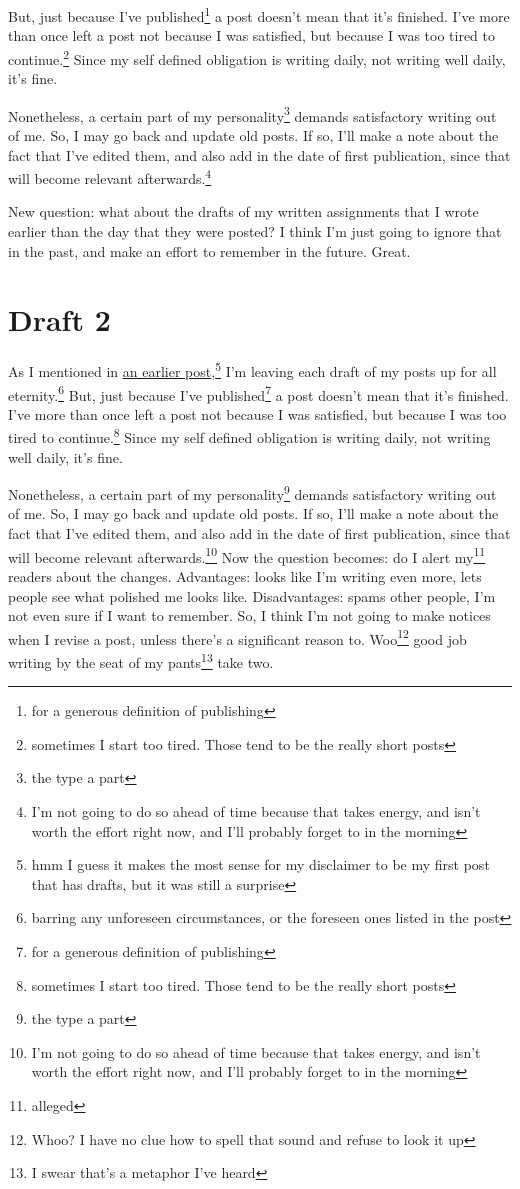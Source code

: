 \documentclass[12pt]{article}[titlepage]
\newcommand{\1}{\={a}}
\newcommand{\2}{\={e}}
\newcommand{\3}{\={\i}}
\newcommand{\4}{\=o}
\newcommand{\5}{\=u}
\newcommand{\6}{\={A}}
\renewcommand{\,}{\textsuperscript{,}}
\begin{document}
But, just because I've published\footnote{for a generous definition of publishing} a post doesn't mean that it's finished.
I've more than once left a post not because I was satisfied, but because I was too tired to continue.\footnote{sometimes I start too tired. Those tend to be the really short posts}
Since my self defined obligation is writing daily, not writing well daily, it's fine.

Nonetheless, a certain part of my personality\footnote{the type a part} demands satisfactory writing out of me.
So, I may go back and update old posts.
If so, I'll make a note about the fact that I've edited them, and also add in the date of first publication, since that will become relevant afterwards.\footnote{I'm not going to do so ahead of time because that takes energy, and isn't worth the effort right now, and I'll probably forget to in the morning}

New question: what about the drafts of my written assignments that I wrote earlier than the day that they were posted?
I think I'm just going to ignore that in the past, and make an effort to remember in the future.
Great.
\section{Draft 2}
As I mentioned in \href{disclaimer.html}{an earlier post},\footnote{hmm I guess it makes the most sense for my disclaimer to be my first post that has drafts, but it was still a surprise} I'm leaving each draft of my posts up for all eternity.\footnote{barring any unforeseen circumstances, or the foreseen ones listed in the post}
But, just because I've published\footnote{for a generous definition of publishing} a post doesn't mean that it's finished.
I've more than once left a post not because I was satisfied, but because I was too tired to continue.\footnote{sometimes I start too tired. Those tend to be the really short posts}
Since my self defined obligation is writing daily, not writing well daily, it's fine.

Nonetheless, a certain part of my personality\footnote{the type a part} demands satisfactory writing out of me.
So, I may go back and update old posts.
If so, I'll make a note about the fact that I've edited them, and also add in the date of first publication, since that will become relevant afterwards.\footnote{I'm not going to do so ahead of time because that takes energy, and isn't worth the effort right now, and I'll probably forget to in the morning}
Now the question becomes: do I alert my\footnote{alleged} readers about the changes.
Advantages: looks like I'm writing even more, lets people see what polished me looks like.
Disadvantages: spams other people, I'm not even sure if I want to remember.
So, I think I'm not going to make notices when I revise a post, unless there's a significant reason to.
Woo\footnote{Whoo? I have no clue how to spell that sound and refuse to look it up} good job writing by the seat of my pants\footnote{I swear that's a metaphor I've heard} take two.
\end{document}
